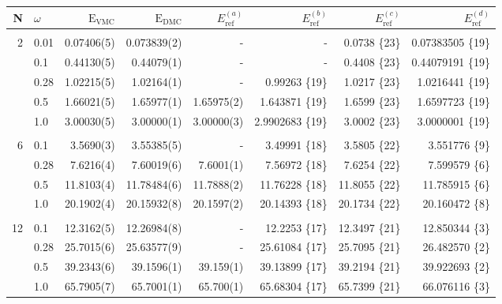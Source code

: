 \setlength{\tabcolsep}{5pt}
\begin{table}
\begin{center}
\begin{tabular}{rl|rrrrrr}
    N     & $\omega$ & $\mathrm{E_{VMC}}$ & $\mathrm{E_{DMC}}$ & $E_\mathrm{ref}^{(a)}$& $E_\mathrm{ref}^{(b)}$ & $E_\mathrm{ref}^{(c)}$ & $E_\mathrm{ref}^{(d)}$\\
\hline\hline
\multicolumn{8}{c}{} \\
    2     &   0.01   & 0.07406(5)  & 0.073839(2)  & -		& -			& 0.0738 \{23\} & 0.07383505 \{19\}\\
          &   0.1    & 0.44130(5)  & 0.44079(1)   & - 		& - 			& 0.4408 \{23\} & 0.44079191 \{19\}\\
          &   0.28   & 1.02215(5)  & 1.02164(1)   & -		&0.99263 \{19\} 	& 1.0217 \{23\}  & 1.0216441 \{19\}\\
          &   0.5    & 1.66021(5)  & 1.65977(1)   & 1.65975(2)&1.643871 \{19\}	& 1.6599 \{23\}  & 1.6597723 \{19\}\\
          &   1.0    & 3.00030(5)  & 3.00000(1)   & 3.00000(3)&2.9902683 \{19\}	& 3.0002 \{23\}  & 3.0000001 \{19\}\\
\cline{2-8}
\multicolumn{8}{c}{} \\
    6     &   0.1    &  3.5690(3)  &  3.55385(5)  & -		&3.49991 \{18\} 	& 3.5805 \{22\}  & 3.551776 \{9\}\\
          &   0.28   &  7.6216(4)  &  7.60019(6)  & 7.6001(1) &7.56972 \{18\} 	& 7.6254 \{22\}  & 7.599579 \{6\}\\
          &   0.5    & 11.8103(4)  & 11.78484(6)  & 11.7888(2)&11.76228 \{18\}	& 11.8055 \{22\} & 11.785915 \{6\}\\
          &   1.0    & 20.1902(4)  & 20.15932(8)  & 20.1597(2)&20.14393 \{18\}	& 20.1734 \{22\} & 20.160472 \{8\}\\
\cline{2-8}
\multicolumn{8}{c}{} \\
    12    &   0.1    & 12.3162(5)  & 12.26984(8)  & - 		&12.2253 \{17\} 	& 12.3497 \{21\} & 12.850344 \{3\}\\
          &   0.28   & 25.7015(6)  & 25.63577(9)  & - 		&25.61084 \{17\} 	& 25.7095 \{21\} & 26.482570 \{2\}\\
          &   0.5    & 39.2343(6)  & 39.1596(1)   & 39.159(1) &39.13899 \{17\}	& 39.2194 \{21\} & 39.922693 \{2\}\\
          &   1.0    & 65.7905(7)  & 65.7001(1)   & 65.700(1) &65.68304 \{17\}	& 65.7399 \{21\} & 66.076116 \{3\}\\

\end{tabular}
\end{center}
\end{table}
